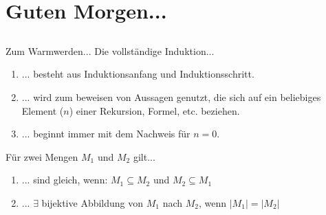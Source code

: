 \section[Einstieg]{Guten Morgen...}
\subsection*{}
\begin{frame}{Zum Warmwerden...}
  Die vollständige Induktion...
    \begin{enumerate}
    \item { 
    ... besteht aus Induktionsanfang und Induktionsschritt.
    }
    \item { 
    ... wird zum beweisen von Aussagen genutzt, die sich auf ein beliebiges Element ($n$) einer Rekursion, Formel, etc. beziehen.
    }
    \item { 
    ... beginnt immer mit dem Nachweis für $n=0$.
    }
    \end{enumerate}

  Für zwei Mengen $M_1$ und $M_2$ gilt...
    \begin{enumerate}
    \item { 
    ... sind gleich, wenn: $M_1 \subseteq M_2$ und $M_2 \subseteq M_1$
    }
    \item { 
    ... $\exists$ bijektive Abbildung von $M_1$ nach $M_2$, wenn $\left|M_1\right| = \left|M_2\right|$
    }
    \end{enumerate}
\end{frame}
